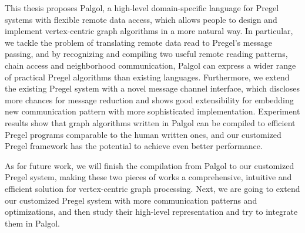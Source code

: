 \documentclass{sokendai_thesis} %
\begin{document}
This thesis proposes Palgol, a high-level domain-specific language for Pregel systems with flexible remote data access, which allows people to design and implement vertex-centric graph algorithms in a more natural way.
In particular, we tackle the problem of translating remote data read to Pregel's message passing, and by recognizing and compiling two useful remote reading patterns, chain access and neighborhood communication, Palgol can express a wider range of practical Pregel algorithms than existing languages.
Furthermore, we extend the existing Pregel system with a novel message channel interface, which discloses more chances for message reduction and shows good extensibility for embedding new communication pattern with more sophisticated implementation.
Experiment results show that graph algorithms written in Palgol can be compiled to efficient Pregel programs comparable to the human written ones, and our customized Pregel framework has the potential to achieve even better performance.

As for future work, we will finish the compilation from Palgol to our customized Pregel system, making these two pieces of works a comprehensive, intuitive and efficient solution for vertex-centric graph processing.
Next, we are going to extend our customized Pregel system with more communication patterns and optimizations, and then study their high-level representation and try to integrate them in Palgol.





%





\begin{appendices}

%

\end{appendices}
\end{document}
